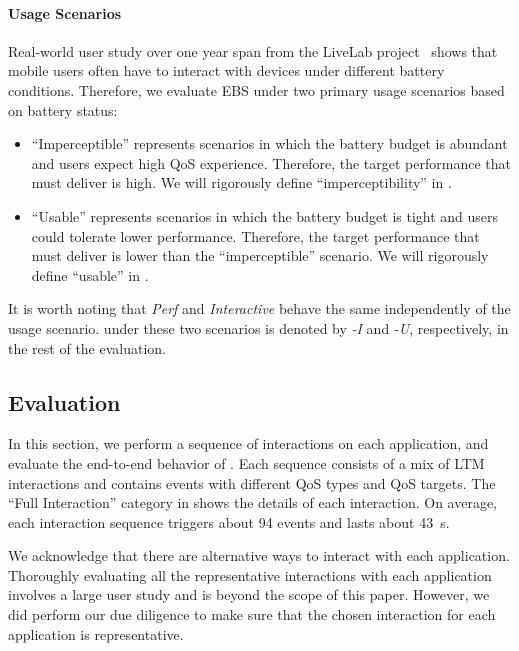 \paragraph{Usage Scenarios} Real-world user study over one year span from the LiveLab project~\cite{livelab} shows that mobile users often have to interact with devices under different battery conditions. Therefore, we evaluate EBS under two primary usage scenarios based on battery status:

\begin{itemize}
  \item ``Imperceptible'' represents scenarios in which the battery budget is abundant and users expect high QoS experience. Therefore, the target performance that \webrt must deliver is high. We will rigorously define ``imperceptibility'' in .
  
  \item ``Usable'' represents scenarios in which the battery budget is tight and users could tolerate lower performance. Therefore, the target performance that \webrt must deliver is lower than the ``imperceptible'' scenario. We will rigorously define ``usable'' in .
\end{itemize}

It is worth noting that \textit{Perf} and \textit{Interactive} behave the same independently of the usage scenario. \ebs under these two scenarios is denoted by \textit{\ebs-I} and \textit{\ebs-U}, respectively, in the rest of the evaluation.



\subsection{Evaluation}
\label{sec:runtime:ebs:eval}

In this section, we perform a sequence of interactions on each application, and evaluate the end-to-end behavior of \ebs. Each sequence consists of a mix of LTM interactions and contains events with different QoS types and QoS targets. The ``Full Interaction'' category in  shows the details of each interaction. On average, each interaction sequence triggers about 94 events and lasts about 43~s.

We acknowledge that there are alternative ways to interact with each application. Thoroughly evaluating all the representative interactions with each application involves a large user study and is beyond the scope of this paper. However, we did perform our due diligence to make sure that the chosen interaction for each application is representative.

